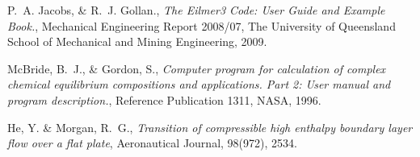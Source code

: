 \documentclass{AIAA}
\begin{document}
\begin{thebibliography}{}
P.~A. Jacobs, \& R.~J. Gollan., {\it The Eilmer3 Code: User Guide and Example Book.}, Mechanical Engineering Report 2008/07, The University of Queensland School of Mechanical and Mining Engineering, 2009.

McBride, B.~J., \& Gordon, S., {\it Computer program for calculation of complex chemical equilibrium	compositions and applications. Part 2: User manual and program description.}, Reference Publication 1311, NASA, 1996.

He, Y. \& Morgan, R.~G., {\it Transition of compressible high enthalpy boundary layer
flow over a flat plate}, Aeronautical Journal, 98(972), 2534.



\end{thebibliography}
\end{document}
